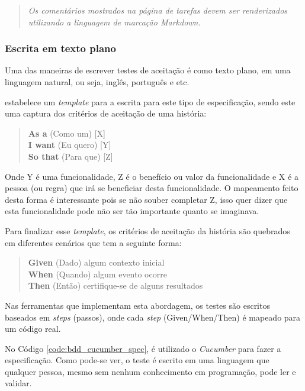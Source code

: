 \begin{quote}
\textit{Os comentários mostrados na página de tarefas devem ser renderizados utilizando a linguagem de marcação Markdown.}
\end{quote}

\subsubsection{Escrita em texto plano}
\label{ssub:escrita_em_texto_plano}

Uma das maneiras de escrever testes de aceitação é como texto plano, em uma linguagem natural, ou seja, inglês, português e etc.

 estabelece um \textit{template} para a escrita para este tipo de especificação, sendo este uma captura dos critérios de aceitação de uma história:

\begin{quote}
\textbf{As a} (Como um) [X]\\
\textbf{I want} (Eu quero) [Y]\\
\textbf{So that} (Para que) [Z]
\end{quote}

Onde Y é uma funcionalidade, Z é o benefício ou valor da funcionalidade e X é a pessoa (ou regra) que irá se beneficiar desta funcionalidade. O mapeamento feito desta forma é interessante pois se não souber completar Z, isso quer dizer que esta funcionalidade pode não ser tão importante quanto se imaginava.

Para finalizar esse \textit{template}, os critérios de aceitação da história são quebrados em diferentes cenários que tem a seguinte forma:

\begin{quote}
\textbf{Given} (Dado) algum contexto inicial\\
\textbf{When} (Quando) algum evento ocorre\\
\textbf{Then} (Então) certifique-se de alguns resultados
\end{quote}

Nas ferramentas que implementam esta abordagem, os testes são escritos baseados em \textit{steps} (passos), onde cada \textit{step} (Given/When/Then) é mapeado para um código real.

No Código \ref{code:bdd_cucumber_spec}, é utilizado o \textit{Cucumber} para fazer a especificação. Como pode-se ver, o teste é escrito em uma linguagem que qualquer pessoa, mesmo sem nenhum conhecimento em programação, pode ler e validar.

